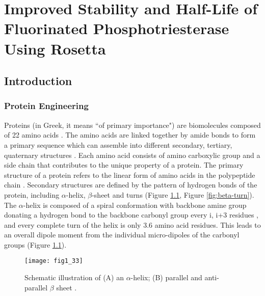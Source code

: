 \chapter{Improved Stability and Half-Life of Fluorinated Phosphotriesterase
Using Rosetta} 
\label{chap:uaa}

\begin{refsection}

\section{Introduction}

\subsection{Protein Engineering}
\label{sec:protein-engineering}

Proteins (in Greek, it means “of primary importance") are biomolecules composed
of 22 amino acids \cite{Nelson2005}. The amino acids are linked together by
amide bonds to form a primary sequence which can assemble into different
secondary, tertiary, quaternary structures \cite{Berg2002a}. Each amino acid
consists of amino carboxylic group and a side chain that contributes to the
unique property of a protein. The primary structure of a protein refers to the
linear form of amino acids in the polypeptide chain \cite{Sanger1945}.
Secondary structures are defined by the pattern of hydrogen bonds of the
protein, including $\alpha$-helix, $\beta$-sheet and turns \cite{PAULING1951}
(Figure \ref{fig:alpha-helix-stabilization}, Figure \ref{fig:beta-turn}).  The
$\alpha$-helix is composed of a spiral conformation with backbone amine group
donating a hydrogen bond to the backbone carbonyl group every i, i+3 residues
\cite{Kabsch1983}, and every complete turn of the helix is only 3.6 amino acid
residues. This leads to an overall dipole moment from the individual
micro-dipoles of the carbonyl groups \cite{Hol1978} (Figure
\ref{fig:alpha-helix-stabilization}).
\begin{figure}[htbp] 
    \centering \texttt{[image: fig1\_33]}
    \caption[Schematic illustration of (A) an $\alpha$-helix; (B) parallel and
    anti-parallel $\beta$ sheet.]{Schematic illustration of (A) an
        $\alpha$-helix; (B) parallel and anti-parallel $\beta$ sheet
        \cite{Bevivino2001,Berg2002a}.}
    \label{fig:alpha-helix-stabilization}
\end{figure}


\end{refsection}
